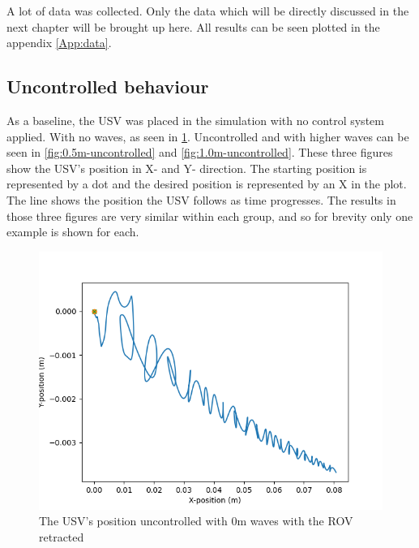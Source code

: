 \documentclass[class=article, crop=false]{standalone}
\begin{document}
A lot of data was collected. Only the data which will be directly discussed in the next chapter will be brought up here. All results can be seen plotted in the appendix \ref{App:data}.

\subsection{Uncontrolled behaviour}
As a baseline, the USV was placed in the simulation with no control system applied. With no waves, as seen in \cref{fig:0-uncontrolled}. Uncontrolled and with higher waves can be seen in \cref{fig:0.5m-uncontrolled} and \cref{fig:1.0m-uncontrolled}. These three figures show the USV's position in X- and Y- direction. The starting position is represented by a dot and the desired position is represented by an X in the plot. The line shows the position the USV follows as time progresses. The results in those three figures are very similar within each group, and so for brevity only one example is shown for each.

\begin{figure}
    \centering
    \includegraphics{scenario1/rov-0m/0.0m/usv_position_uncontrolled}
    \caption{The USV's position uncontrolled with 0m waves with the ROV retracted}
    \label{fig:0-uncontrolled}
\end{figure}
\end{document}
